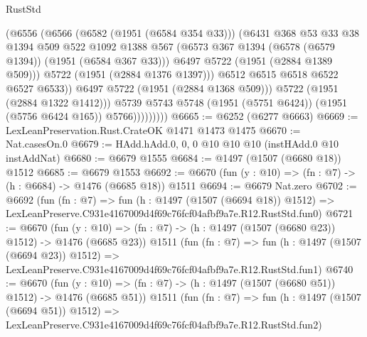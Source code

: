 \begin{lexlean}{RustStd}
\begin{coremodule}
                            (@6556
                              (@6566
                                (@6582 (@1951 (@6584 @354 @33)))
                                (@6431
                                  @368
                                  @53
                                  @33
                                  @38
                                  @1394
                                  @509
                                  @522
                                  @1092
                                  @1388
                                  @567
                                  (@6573 @367 @1394 (@6578 (@6579 @1394)) (@1951 (@6584 @367 @33)))
                                  @6497
                                  @5722
                                  (@1951 (@2884 @1389 @509)))
                                @5722
                                (@1951 (@2884 @1376 @1397)))
                              @6512
                              @6515
                              @6518
                              @6522
                              @6527
                              @6533))
                          @6497
                          @5722
                          (@1951 (@2884 @1368 @509)))
                        @5722
                        (@1951 (@2884 @1322 @1412)))
                      @5739
                      @5743
                      @5748
                      (@1951 (@5751 @6424))
                      (@1951 (@5756 @6424 @165))
                      @5766)))))))))
@6665 := @6252 (@6277 @6663)
@6669 := LexLeanPreservation.Rust.CrateOK @1471 @1473 @1475
@6670 := Nat.casesOn.{0}
@6679 := HAdd.hAdd.{0, 0, 0} @10 @10 @10 (instHAdd.{0} @10 instAddNat)
@6680 := @6679 @1555
@6684 := @1497 (@1507 (@6680 @18)) @1512
@6685 := @6679 @1553
@6692 := @6670 (fun (y : @10) => (fn : @7) -> (h : @6684) -> @1476 (@6685 @18)) @1511
@6694 := @6679 Nat.zero
@6702 := @6692
    (fun (fn : @7) =>
    fun (h : @1497 (@1507 (@6694 @18)) @1512) =>
    LexLeanPreserve.C931e4167009d4f69c76fcf04afbf9a7e.R12.RustStd.fun0)
@6721 := @6670
    (fun (y : @10) => (fn : @7) -> (h : @1497 (@1507 (@6680 @23)) @1512) -> @1476 (@6685 @23))
    @1511
    (fun (fn : @7) =>
    fun (h : @1497 (@1507 (@6694 @23)) @1512) =>
    LexLeanPreserve.C931e4167009d4f69c76fcf04afbf9a7e.R12.RustStd.fun1)
@6740 := @6670
    (fun (y : @10) => (fn : @7) -> (h : @1497 (@1507 (@6680 @51)) @1512) -> @1476 (@6685 @51))
    @1511
    (fun (fn : @7) =>
    fun (h : @1497 (@1507 (@6694 @51)) @1512) =>
    LexLeanPreserve.C931e4167009d4f69c76fcf04afbf9a7e.R12.RustStd.fun2)

\end{coremodule}
\end{lexlean}
